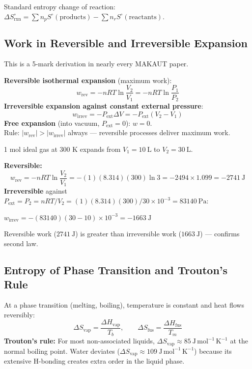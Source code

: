\documentclass[12pt,a4paper]{article}
\begin{document}
Standard entropy change of reaction: $\Delta S^\circ_{\mathrm{rxn}} = \sum n_p S^\circ(\text{products}) - \sum n_r S^\circ(\text{reactants})$.

\subsection{Work in Reversible and Irreversible Expansion}
This is a 5-mark derivation in nearly every MAKAUT paper.

\begin{tcolorbox}[formulabox, title={Work Done by an Ideal Gas}]
\textbf{Reversible isothermal expansion} (maximum work):
\[
w_{\mathrm{rev}} = -nRT\ln\frac{V_2}{V_1} = -nRT\ln\frac{P_1}{P_2}
\]
\textbf{Irreversible expansion against constant external pressure}:
\[
w_{\mathrm{irrev}} = -P_{\mathrm{ext}}\Delta V = -P_{\mathrm{ext}}(V_2-V_1)
\]
\textbf{Free expansion} (into vacuum, $P_{\mathrm{ext}}=0$): $w = 0$.\\
Rule: $|w_{\mathrm{rev}}| > |w_{\mathrm{irrev}}|$ always — reversible processes deliver maximum work.
\end{tcolorbox}

\begin{tcolorbox}[examplebox, title={Solved Example: Reversible vs Irreversible Work}]
1 mol ideal gas at 300 K expands from $V_1=10\ \mathrm{L}$ to $V_2=30\ \mathrm{L}$.

\textbf{Reversible:}
\[
w_{\mathrm{rev}} = -nRT\ln\frac{V_2}{V_1} = -(1)(8.314)(300)\ln 3 = -2494\times1.099 = -2741\ \mathrm{J}
\]
\textbf{Irreversible} against $P_{\mathrm{ext}} = P_2 = nRT/V_2 = (1)(8.314)(300)/30\times10^{-3} = 83140\ \mathrm{Pa}$:

$w_{\mathrm{irrev}} = -(83140)(30-10)\times10^{-3} = -1663\ \mathrm{J}$

Reversible work ($2741\ \mathrm{J}$) is greater than irreversible work ($1663\ \mathrm{J}$) — confirms second law.
\end{tcolorbox}

\subsection{Entropy of Phase Transition and Trouton's Rule}
At a phase transition (melting, boiling), temperature is constant and heat flows reversibly:
\[
\Delta S_{\mathrm{vap}} = \frac{\Delta H_{\mathrm{vap}}}{T_b}, \qquad \Delta S_{\mathrm{fus}} = \frac{\Delta H_{\mathrm{fus}}}{T_m}
\]
\textbf{Trouton's rule:} For most non-associated liquids, $\Delta S_{\mathrm{vap}} \approx 85\ \mathrm{J\,mol^{-1}\,K^{-1}}$ at the normal boiling point. Water deviates ($\Delta S_{\mathrm{vap}} \approx 109\ \mathrm{J\,mol^{-1}\,K^{-1}}$) because its extensive H-bonding creates extra order in the liquid phase.
\end{document}
